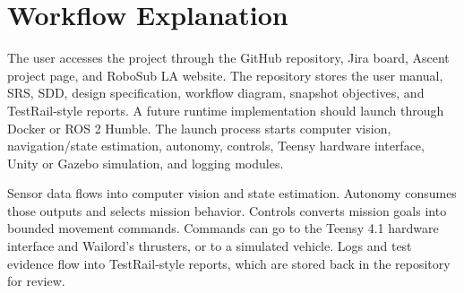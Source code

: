 \documentclass[12pt]{article}
\begin{document}
\section*{Workflow Explanation}
The user accesses the project through the GitHub repository, Jira board, Ascent project page, and RoboSub LA website. The repository stores the user manual, SRS, SDD, design specification, workflow diagram, snapshot objectives, and TestRail-style reports. A future runtime implementation should launch through Docker or ROS 2 Humble. The launch process starts computer vision, navigation/state estimation, autonomy, controls, Teensy hardware interface, Unity or Gazebo simulation, and logging modules.

Sensor data flows into computer vision and state estimation. Autonomy consumes those outputs and selects mission behavior. Controls converts mission goals into bounded movement commands. Commands can go to the Teensy 4.1 hardware interface and Wailord's thrusters, or to a simulated vehicle. Logs and test evidence flow into TestRail-style reports, which are stored back in the repository for review.
\end{document}
